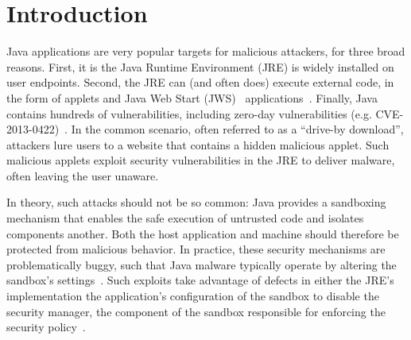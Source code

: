 \documentclass{sig-alternate}
\begin{document}
\section{Introduction}

Java applications are very popular targets for malicious attackers,%
for three broad reasons.  First,
it is the Java Runtime Environment (JRE) is widely installed on user endpoints.
Second, the JRE can (and often does) execute external code, in the form of
applets and Java Web Start (JWS)~\cite{_java_web_start}
applications~\cite{gong1997going,gong2003inside}.  Finally, Java contains
hundreds of vulnerabilities, including zero-day vulnerabilities (e.g. CVE-2013-0422)~\cite{xforceQ12013}.  In the
common scenario, often referred to as a ``drive-by download'', attackers lure
users to a website that contains a hidden malicious applet. Such malicious
applets exploit security vulnerabilities in the JRE to deliver malware,
often leaving the user unaware.

In theory, such attacks should not be so common: 
Java provides a sandboxing mechanism that enables the safe execution of untrusted code and isolates
components another. Both the host application and machine should
therefore be protected from malicious behavior.
In practice, these security mechanisms are problematically
buggy, such that Java malware typically operate by altering the sandbox's
settings~\cite{garber_2012}.  Such exploits take advantage of defects in either
the JRE's implementation the application's configuration of the sandbox to 
disable the security manager, the component of the sandbox responsible for enforcing the
security policy~\cite{fireeye_2013,svoboda_anatomy_blog_2013,security_explorations_2012,blackhat_2012}.
\end{document}
